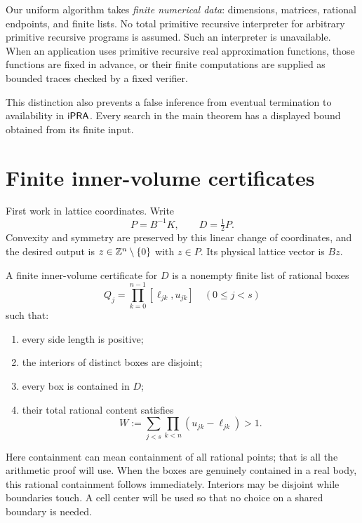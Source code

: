 Our uniform algorithm takes \emph{finite numerical data}: dimensions,
matrices, rational endpoints, and finite lists. No total primitive
recursive interpreter for arbitrary primitive recursive programs is
assumed. Such an interpreter is unavailable. When an application uses
primitive recursive real approximation functions, those functions are
fixed in advance, or their finite computations are supplied as bounded
traces checked by a fixed verifier.

This distinction also prevents a false inference from eventual
termination to availability in \(\mathsf{iPRA}\).
Every search in the main theorem has a displayed bound obtained from
its finite input.

\section{Finite inner-volume certificates}\label{sec:certificate}

First work in lattice coordinates. Write
\[
 P=B^{-1}K,\qquad D=\tfrac12P.
\]
Convexity and symmetry are preserved by this linear change of
coordinates, and the desired output is \(z\in\mathbb Z^n\setminus\{0\}\)
with \(z\in P\). Its physical lattice vector is \(Bz\).

\begin{definition}\label{def:cert}
A finite inner-volume certificate for \(D\) is a nonempty finite list
of rational boxes
\[
 Q_j=\prod_{k=0}^{n-1}[\ell_{jk},u_{jk}]
 \quad(0\leq j<s)
\]
such that:
\begin{enumerate}
\item every side length is positive;
\item the interiors of distinct boxes are disjoint;
\item every box is contained in \(D\);
\item their total rational content satisfies
\begin{equation}\label{eq:box-volume}
 W:=\sum_{j<s}\prod_{k<n}(u_{jk}-\ell_{jk})>1.
\end{equation}
\end{enumerate}
\end{definition}

Here containment can mean containment of all rational points; that is
all the arithmetic proof will use. When the boxes are genuinely
contained in a real body, this rational containment follows immediately.
Interiors may be disjoint while boundaries touch. A cell center will be
used so that no choice on a shared boundary is needed.

